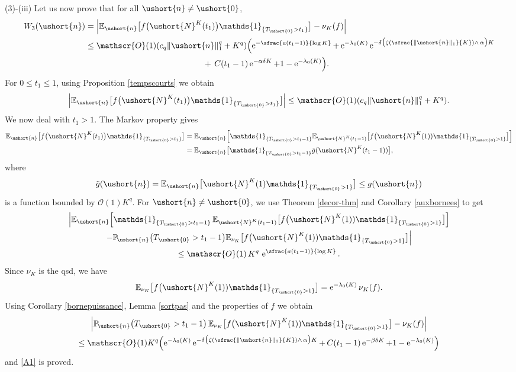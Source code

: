 \documentclass[10pt]{amsart}
\newcommand{\Psfrac}[2]{(\sfrac{#1}{#2})}
\let\mathcal\mathscr
\numberwithin{equation}{section}
\theoremstyle{plain}
\theoremstyle{definition}
\newcommand{\proba}{{\mathbb{P}}}
\newcommand{\E}{{\mathbb{E}}}
\newcommand{\Oun}{\mathcal{O}(1)}
\newcommand{\un}{\mathds{1}}
\newcommand{\vecn}{\ushort{n}}
\newcommand{\veczer}{\ushort{0}}
\newcommand{\leproc}{\ushort{N}^{K}}
\newcommand{\sleproc}{\ushort{N}^{K}}
\newcommand{\nuk}{\nu_{K}}\let\snuk\nuk
\newcommand{\e}{\operatorname{e}}
\newcommand{\norm}[1]{\|#1\|_{1}}\let\snorm\norm
\begin{document}
(3)-(iii) Let us now prove that for all $\vecn\neq \veczer$,
\begin{equation}
\label{A1}
\begin{split}
W_{3}(\vecn)
&= \left|\E_{\vecn}\bigl[f\bigl(\leproc(t_{1})\bigr)\un_{\{T_{\veczer}>t_{1}\}}\bigr]-\nuk(f)\right| \\
& \leq \Oun (c_q \norm{\vecn}^{q} + K^q)\Bigl(\e^{-\sfrac{a (t_{1}-1)}{\log K}} + \e^{-\lambda_0(K)}
\e^{-\delta\bigl(\zeta\Psfrac{\|\vecn\|_{1}}{K}\wedge\, \alpha \bigr)K} \\
& \hspace*{5cm} + \,C(t_1-1)\e^{-\alpha\delta K}+1-\e^{-\lambda_0(K)}\Bigr).
\end{split}
\end{equation}
For $0\leq t_1\leq 1$, using Proposition \ref{tempscourts} we obtain
\[
\left|
\E_{\vecn}\bigl[f\bigl(\leproc(t_{1})\bigr)\un_{\{T_{\veczer}>t_{1}\}}\bigr]\right|
\leq \Oun (c_q\norm{\vecn}^{q} + K^q).
\]
We now deal with $t_1>1$.
The Markov property gives
\begin{align*}
\E_{\vecn}\bigl[f\bigl(\leproc(t_{1})\bigr)\un_{\{T_{\veczer}>t_{1}\}}\bigr]
& = \E_{\vecn}\Bigl[\un_{\{T_{\veczer}>t_{1}-1\}}
\E_{\sleproc(t_{1}-1)}\bigl[f\bigl(\leproc(1)) \un_{\{T_{\veczer}>1\}}\bigr]\Bigr]\\
& = \E_{\vecn}\bigl[\un_{\{T_{\veczer}>t_{1}-1\}}
\tilde g(\leproc(t_{1}-1))\bigr],
\end{align*}
where
\[
\tilde g (\vecn) = \E_{\vecn}\bigl[\leproc(1) \un_{\{T_{\veczer}>1\}}\bigr] \leq g(\vecn)
\]
is a function bounded by $\Oun K^q$.
For $\vecn\neq \veczer$, we use Theorem \ref{decor-thm} and Corollary \ref{auxbornees} to get
\begin{multline*}
\Big|
\E_{\vecn}\Bigl[\un_{\{T_{\veczer}>t_{1}-1\}}\,
\E_{\sleproc(t_{1}-1)}\bigl[f\bigl(\leproc(1)) \un_{\{T_{\veczer}>1\}}\bigr]
\Bigr] \\
-\proba_{\!\vecn}\bigl(T_{\veczer}>t_1-1\bigr) \E_{\snuk}\bigl[f\bigl(\leproc(1)) \un_{\{T_{\veczer}>1\}}\bigr]
\Big| \\
\leq\Oun\, K^q\, \e^{\sfrac{a(t_{1}-1)}{\log K}}.
\end{multline*}
Since $\nuk$ is the qsd, we have
\[
\E_{\snuk}\bigl[f\bigl(\leproc(1)) \un_{\{T_{\veczer}>1\}}\bigr]= \e^{-\lambda_0(K)} \nuk(f).
\]
Using Corollary \ref{bornepuissance}, Lemma \ref{sortpas} and the properties of $f$ we obtain
\begin{multline*}
\left|\proba_{\!\vecn}\bigl(T_{\veczer}>t_1-1\bigr)\, \E_{\snuk}\bigl[f\bigl(\leproc(1)) \un_{\{T_{\veczer}>1\}}\bigr]
-\nuk(f)\right|\\
\leq \Oun K^q\Bigl(\e^{-\lambda_0(K)}\e^{-\delta\bigl(\zeta\Psfrac{\|\vecn\|_{1}}{K}\wedge\, \alpha \bigr)K} +\, C(t_1-1)\e^{-\beta\delta K}+
1-\e^{-\lambda_0(K)}\Bigr)
\end{multline*}
and \eqref{A1} is proved.
\end{document}
